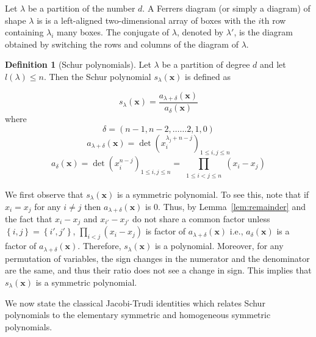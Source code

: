 \documentclass[10pt,a4paper]{article}
\theoremstyle{definition}
\newtheorem{definition}[theorem]{Definition}
\newcommand{\vx}{\mathbf x}
\newcommand{\set}[1]{\left\{#1\right\}}
\begin{document}
Let $\lambda$ be a partition of the number $d$. A Ferrers diagram (or simply a diagram) of shape $\lambda$ is is a left-aligned two-dimensional array of boxes with the $i$th row containing $\lambda_i$ many boxes.  The conjugate of $\lambda$, denoted by $\lambda'$, is the diagram obtained by switching the rows and columns of the diagram of $\lambda$. 

%
%
 
\begin{definition}[Schur polynomials] \label{def: Schur defn}
Let $\lambda$ be a partition of degree $d$ and let $l(\lambda) \leq n$. Then the Schur polynomial $s_\lambda(\vx)$ is defined as 
	
	$$s_\lambda(\vx)= \frac{a_{\lambda+\delta}(\vx)}{a_\delta(\vx)}$$
	where $$\delta = (n-1,n-2, \ldots \ldots 2,1,0)$$ \quad  $$a_{\lambda+\delta}(\vx)=\det(x_i^{\lambda_j+n-j})_{1 \leq i,j \leq n}$$ \quad 
	$$a_{\delta}(\vx)=\det(x_i^{n-j})_{1 \leq i,j \leq n}= \prod\limits_{\substack{1 \leq i<j \leq n}}(x_i-x_j)$$
\end{definition}

We first observe that $s_\lambda(\vx)$ is a symmetric polynomial. To see this, note that if $x_i=x_j$ for any $i \neq j$ then $a_{\lambda+\delta}(\vx)$ is $0$. Thus, by Lemma~\ref{lem:remainder} and the fact that $x_i-x_j$ and $x_{i'}-x_{j'}$ do not share a common factor unless $\set{i, j} = \set{i', j'}$, $\prod_{i<j}(x_i-x_j)$ is factor of $a_{\lambda+\delta}(\vx)$ i.e., $a_\delta(\vx)$ is a factor of $a_{\lambda+\delta}(\vx)$. Therefore, $s_\lambda(\vx)$ is a polynomial. Moreover, for any permutation of variables, the sign changes in the numerator and the denominator are the same, and thus their ratio does not see a change in sign. This implies that $s_{\lambda}(\vx)$ is a symmetric polynomial. 

We now state the classical Jacobi-Trudi identities which relates Schur polynomials to the elementary symmetric and homogeneous symmetric polynomials.
%
\end{document}

